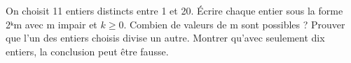 \documentclass[11pt]{article}
\begin{document}
On choisit 11 entiers distincts entre 1 et 20. Écrire chaque entier sous la forme 2ᵏm avec m impair et \(k \geq  0\). Combien de valeurs de m sont possibles ? Prouver que l’un des entiers choisis divise un autre. Montrer qu’avec seulement dix entiers, la conclusion peut être fausse.\par
\vspace{5pt}
\end{document}
